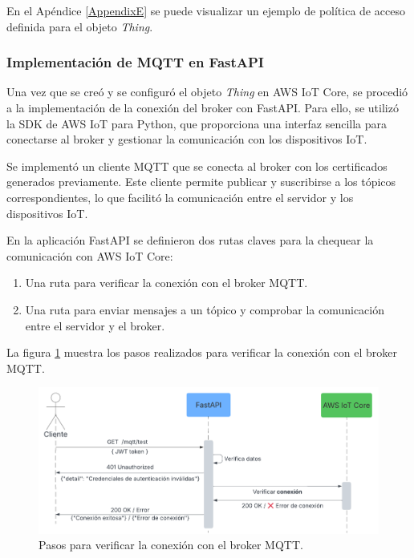 En el Apéndice \ref{AppendixE} se puede visualizar un ejemplo de política de acceso
definida para el objeto \textit{Thing}.

\subsubsection{Implementación de MQTT en FastAPI}
Una vez que se creó y se configuró el objeto \textit{Thing} en AWS IoT Core, se
procedió a la implementación de la conexión del broker con FastAPI. Para ello,
se utilizó la SDK de AWS IoT para Python, que proporciona una interfaz sencilla
para conectarse al broker y gestionar la comunicación con los dispositivos IoT.

Se implementó un cliente MQTT que se conecta al broker con los certificados
generados previamente. Este cliente permite publicar y suscribirse a los
tópicos correspondientes, lo que facilitó la comunicación entre el servidor y
los dispositivos IoT.


En la aplicación FastAPI se definieron dos rutas claves para la chequear la
comunicación con AWS IoT Core:

\begin{enumerate}
    \item Una ruta para verificar la conexión con el broker MQTT.
    \item Una ruta para enviar mensajes a un tópico y comprobar la comunicación entre el
          servidor y el broker.
\end{enumerate}

La figura \ref{fig:test_mqtt} muestra los pasos realizados para verificar la
conexión con el broker MQTT. 

\begin{figure}[H]
    \centering
    \includegraphics[width=.90\textwidth]{./Images/20.png}
    \caption{Pasos para verificar la conexión con el broker MQTT.}
    \label{fig:test_mqtt}
\end{figure}

